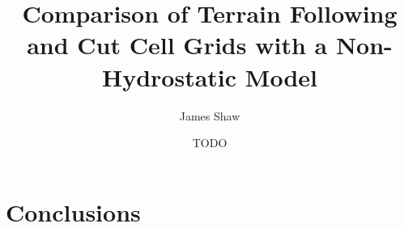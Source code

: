 \documentclass[a4paper]{article}
\title{Comparison of Terrain Following and Cut Cell Grids with a Non-Hydrostatic Model}
\author{James Shaw}
\date{TODO}
\begin{document}
\maketitle

\section{Conclusions}
\end{document}
